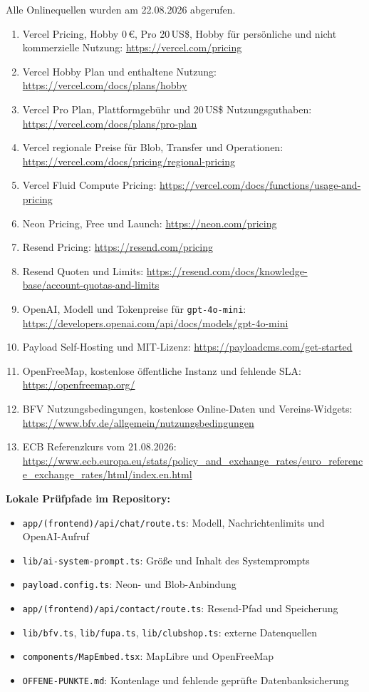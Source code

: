 \documentclass[11pt,a4paper]{article}
\newcommand{\eur}[1]{#1\,€}
\newcommand{\usd}[1]{#1\,US\$}
\begin{document}
Alle Onlinequellen wurden am 22.08.2026 abgerufen.

\begin{enumerate}
  \item Vercel Pricing, Hobby \eur{0}, Pro \usd{20}, Hobby für persönliche und nicht kommerzielle Nutzung: \url{https://vercel.com/pricing}
  \item Vercel Hobby Plan und enthaltene Nutzung: \url{https://vercel.com/docs/plans/hobby}
  \item Vercel Pro Plan, Plattformgebühr und \usd{20} Nutzungsguthaben: \url{https://vercel.com/docs/plans/pro-plan}
  \item Vercel regionale Preise für Blob, Transfer und Operationen: \url{https://vercel.com/docs/pricing/regional-pricing}
  \item Vercel Fluid Compute Pricing: \url{https://vercel.com/docs/functions/usage-and-pricing}
  \item Neon Pricing, Free und Launch: \url{https://neon.com/pricing}
  \item Resend Pricing: \url{https://resend.com/pricing}
  \item Resend Quoten und Limits: \url{https://resend.com/docs/knowledge-base/account-quotas-and-limits}
  \item OpenAI, Modell und Tokenpreise für \texttt{gpt-4o-mini}: \url{https://developers.openai.com/api/docs/models/gpt-4o-mini}
  \item Payload Self-Hosting und MIT-Lizenz: \url{https://payloadcms.com/get-started}
  \item OpenFreeMap, kostenlose öffentliche Instanz und fehlende SLA: \url{https://openfreemap.org/}
  \item BFV Nutzungsbedingungen, kostenlose Online-Daten und Vereins-Widgets: \url{https://www.bfv.de/allgemein/nutzungsbedingungen}
  \item ECB Referenzkurs vom 21.08.2026: \url{https://www.ecb.europa.eu/stats/policy_and_exchange_rates/euro_reference_exchange_rates/html/index.en.html}
\end{enumerate}

\textbf{Lokale Prüfpfade im Repository:}

\begin{itemize}
  \item \texttt{app/(frontend)/api/chat/route.ts}: Modell, Nachrichtenlimits und OpenAI-Aufruf
  \item \texttt{lib/ai-system-prompt.ts}: Größe und Inhalt des Systemprompts
  \item \texttt{payload.config.ts}: Neon- und Blob-Anbindung
  \item \texttt{app/(frontend)/api/contact/route.ts}: Resend-Pfad und Speicherung
  \item \texttt{lib/bfv.ts}, \texttt{lib/fupa.ts}, \texttt{lib/clubshop.ts}: externe Datenquellen
  \item \texttt{components/MapEmbed.tsx}: MapLibre und OpenFreeMap
  \item \texttt{OFFENE-PUNKTE.md}: Kontenlage und fehlende geprüfte Datenbanksicherung
\end{itemize}
\end{document}
